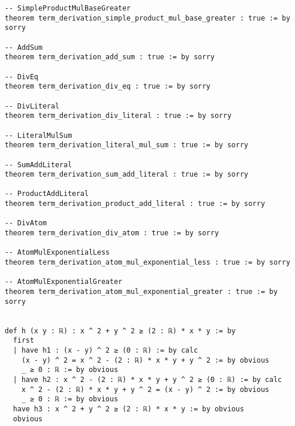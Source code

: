 \documentclass{article}
\begin{document}
\begin{tcolorbox}[colback=white!10, width=\linewidth]
\begin{lstlisting}[language=Lean4]
-- SimpleProductMulBaseGreater
theorem term_derivation_simple_product_mul_base_greater : true := by sorry

-- AddSum
theorem term_derivation_add_sum : true := by sorry

-- DivEq
theorem term_derivation_div_eq : true := by sorry

-- DivLiteral
theorem term_derivation_div_literal : true := by sorry

-- LiteralMulSum
theorem term_derivation_literal_mul_sum : true := by sorry

-- SumAddLiteral
theorem term_derivation_sum_add_literal : true := by sorry

-- ProductAddLiteral
theorem term_derivation_product_add_literal : true := by sorry

-- DivAtom
theorem term_derivation_div_atom : true := by sorry

-- AtomMulExponentialLess
theorem term_derivation_atom_mul_exponential_less : true := by sorry

-- AtomMulExponentialGreater
theorem term_derivation_atom_mul_exponential_greater : true := by sorry


def h (x y : ℝ) : x ^ 2 + y ^ 2 ≥ (2 : ℝ) * x * y := by
  first
  | have h1 : (x - y) ^ 2 ≥ (0 : ℝ) := by calc
    (x - y) ^ 2 = x ^ 2 - (2 : ℝ) * x * y + y ^ 2 := by obvious
    _ ≥ 0 : ℝ := by obvious
  | have h2 : x ^ 2 - (2 : ℝ) * x * y + y ^ 2 ≥ (0 : ℝ) := by calc
    x ^ 2 - (2 : ℝ) * x * y + y ^ 2 = (x - y) ^ 2 := by obvious
    _ ≥ 0 : ℝ := by obvious
  have h3 : x ^ 2 + y ^ 2 ≥ (2 : ℝ) * x * y := by obvious
  obvious

\end{lstlisting}
\end{tcolorbox}
\end{document}
